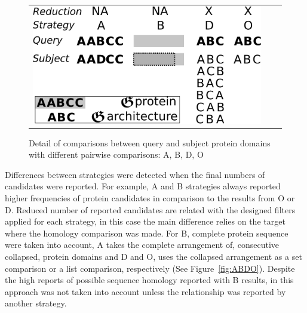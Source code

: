 \documentclass[11pt]{article}
\begin{document}
\begin{figure}
  \begin{tabular}{lcr}
    \begin{minipage}{0.55\textwidth}
    \centering
    \includegraphics[scale=0.4]{figures/ABDO}
    \end{minipage}
    & \qquad &
    \begin{minipage}{0.35\textwidth}
      \caption{Detail of comparisons between query and subject protein domains with 
	    different pairwise comparisons: A, B, D, O}\label{fig:FrecEstrat}
    \end{minipage}
  \end{tabular}
\end{figure}


Differences between strategies were detected when the final numbers of candidates were
 reported. For example, A and B strategies always reported higher frequencies of 
protein candidates in comparison to the results from O or D. Reduced number of
reported candidates are related with the designed filters applied for each
strategy, in this case the main difference relies on the target where the
homology comparison was made. For B, complete protein sequence were taken into
account, A takes the complete arrangement of, consecutive collapsed, protein domains
and D and O, uses the collapsed arrangement as a set comparison or a 
list comparison, respectively (See Figure~\ref{fig:ABDO}). Despite the high reports of
possible sequence homology reported with B results, in this approach was not taken
into account unless the relationship was reported by another strategy.
\end{document}
